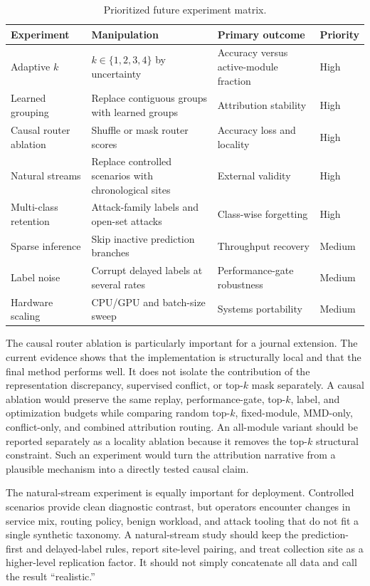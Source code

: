 \begin{table}[t]
\caption{Prioritized future experiment matrix.}
\label{tab:future-experiments}
\centering
\scriptsize
\begin{tabular}{p{}p{}p{}p{}}
\toprule
Experiment & Manipulation & Primary outcome & Priority\\
\midrule
Adaptive $k$ & $k\in\{1,2,3,4\}$ by uncertainty & Accuracy versus active-module fraction & High\\
Learned grouping & Replace contiguous groups with learned groups & Attribution stability & High\\
Causal router ablation & Shuffle or mask router scores & Accuracy loss and locality & High\\
Natural streams & Replace controlled scenarios with chronological sites & External validity & High\\
Multi-class retention & Attack-family labels and open-set attacks & Class-wise forgetting & High\\
Sparse inference & Skip inactive prediction branches & Throughput recovery & Medium\\
Label noise & Corrupt delayed labels at several rates & Performance-gate robustness & Medium\\
Hardware scaling & CPU/GPU and batch-size sweep & Systems portability & Medium\\
\bottomrule
\end{tabular}
\end{table}

The causal router ablation is particularly important for a journal extension. The current evidence shows that the implementation is structurally local and that the final method performs well. It does not isolate the contribution of the representation discrepancy, supervised conflict, or top-$k$ mask separately. A causal ablation would preserve the same replay, performance-gate, top-$k$, label, and optimization budgets while comparing random top-$k$, fixed-module, MMD-only, conflict-only, and combined attribution routing. An all-module variant should be reported separately as a locality ablation because it removes the top-$k$ structural constraint. Such an experiment would turn the attribution narrative from a plausible mechanism into a directly tested causal claim.

The natural-stream experiment is equally important for deployment. Controlled scenarios provide clean diagnostic contrast, but operators encounter changes in service mix, routing policy, benign workload, and attack tooling that do not fit a single synthetic taxonomy. A natural-stream study should keep the prediction-first and delayed-label rules, report site-level pairing, and treat collection site as a higher-level replication factor. It should not simply concatenate all data and call the result ``realistic.''

